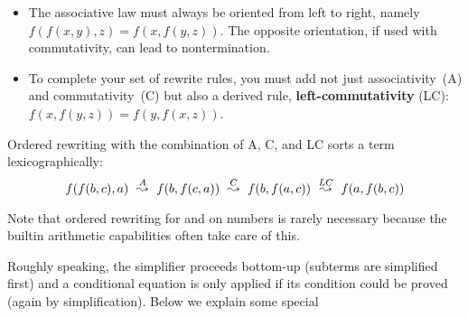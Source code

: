 \begin{isabellebody}
\begin{isamarkuptext}
\begin{itemize}
\item The associative law must always be oriented from left to right,
  namely $f(f(x,y),z) = f(x,f(y,z))$.  The opposite orientation, if
  used with commutativity, can lead to nontermination.

\item To complete your set of rewrite rules, you must add not just
  associativity~(A) and commutativity~(C) but also a derived rule, {\bf
    left-com\-mut\-ativ\-ity} (LC): $f(x,f(y,z)) = f(y,f(x,z))$.
\end{itemize}
Ordered rewriting with the combination of A, C, and LC sorts a term
lexicographically:
\[\def\maps#1{~\stackrel{#1}{\leadsto}~}
 f(f(b,c),a) \maps{A} f(b,f(c,a)) \maps{C} f(b,f(a,c)) \maps{LC} f(a,f(b,c)) \]

Note that ordered rewriting for \isa{{\isacharplus}} and \isa{{\isacharasterisk}} on numbers is rarely
necessary because the builtin arithmetic capabilities often take care of
this.%
\end{isamarkuptext}%
%
%
\begin{isamarkuptext}%
\label{sec:SimpHow}
Roughly speaking, the simplifier proceeds bottom-up (subterms are simplified
first) and a conditional equation is only applied if its condition could be
proved (again by simplification). Below we explain some special%
\end{isamarkuptext}%
%
%
%
%
\begin{isamarkuptext}%
%
\end{isamarkuptext}%
\end{isabellebody}%

